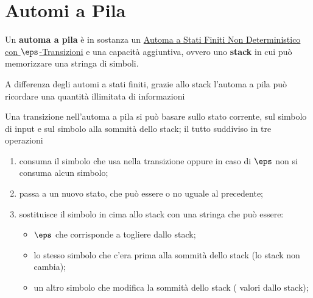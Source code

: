 \section{Automi a Pila}\label{sec:ll_automi_a_pila} %
Un \textbf{automa a pila} è in sostanza un \hyperref[def:enfa]{Automa a Stati Finiti Non Deterministico con $\eps$-Transizioni} e una capacità aggiuntiva, ovvero uno \textbf{stack} in cui può memorizzare una stringa di simboli.
\begin{note}
    A differenza degli automi a stati finiti, grazie allo stack l'automa a pila può ricordare una quantità illimitata di informazioni
    \begin{warning}
    \end{warning}
\end{note}
Una transizione nell'automa a pila si può basare sullo stato corrente, sul simbolo di input e sul simbolo alla sommità dello stack; il tutto suddiviso in tre operazioni
\begin{enumerate}
    \item consuma il simbolo che usa nella transizione oppure in caso di $\eps$ non si consuma alcun simbolo;
    \item passa a un nuovo stato, che può essere o no uguale al precedente;
    \item sostituisce il simbolo in cima allo stack con una stringa che può essere:
        \begin{itemize}
            \item $\eps$ che corrisponde a togliere dallo stack;
            \item lo stesso simbolo che c'era prima alla sommità dello stack (lo stack non cambia);
            \item un altro simbolo che modifica la sommità dello stack ( valori dallo stack);
        \end{itemize}
\end{enumerate}
